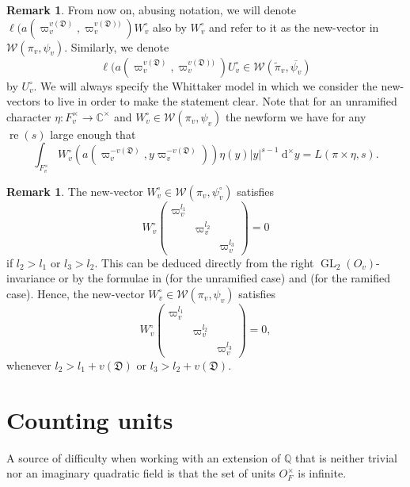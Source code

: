 \documentclass[a4paper,11pt]{amsart}
\theoremstyle{definition}
\newtheorem{remark}[theorem]{Remark}
\newcommand{\Q}{\mathbb{Q}}
\newcommand{\gelle}{\operatorname{GL}}
\newcommand{\real}{\operatorname{re}}
\newcommand{\CC}{\mathbb{C}}
\begin{document}
    \begin{remark}\label{rmk:newform}
        From now on, abusing notation, we will denote $\ell(a(\varpi_v^{v(\mathfrak{D})},\varpi_v^{v(\mathfrak{D}))})W_v^{\circ}$ also by $W_v^{\circ}$ and refer to it as the new-vector in $\mathcal{W}(\pi_v,\psi_v)$. Similarly, we denote $$\ell(a(\varpi_v^{v(\mathfrak{D})},\varpi_v^{v(\mathfrak{D}))}) U_v^\circ \in \mathcal{W}(\tilde{\pi}_v,\overline{\psi_v})$$ by $U_v^\circ$. We will always specify the Whittaker model in which we consider the new-vectors to live in order to make the statement clear.
        Note that for an unramified character $\eta \colon F_v^{\times}\to \CC^{\times}$ and $W_v^{\circ}\in \mathcal{W}(\pi_v,\psi_v)$ the newform we have for any $\real(s)$ large enough that
        \[\int_{F_v^{\times}}W_v^{\circ}(a(\varpi_v^{-v(\mathfrak{D})},y\varpi_v^{-v(\mathfrak{D})}))\eta(y)\vert{y}\vert^{s-1}\ \mathrm{d}^{\times}y = L(\pi\times\eta,s). \]
    \end{remark}
    
\begin{remark}
    The new-vector $W_v^{\circ}\in \mathcal{W}(\pi_v,\psi_v^{\circ})$ satisfies 
    \[ W_v^{\circ}\begin{pmatrix}
        \varpi_v^{l_1}&&\\&\varpi_v^{l_2}&\\&&\varpi_v^{l_3}
    \end{pmatrix}=0\]
    if $l_2>l_1$ or $l_3>l_2$. This can be deduced directly from the right $\gelle_2(O_v)$-invariance or by the formulae in \cite{Shalika} (for the unramified case) and \cite{matringe2012essential} (for the ramified case).
    Hence, the new-vector $W_v^{\circ} \in \mathcal{W}(\pi_v,\psi_v)$ satisfies 
    \[W_v^{\circ}\begin{pmatrix}
        \varpi_v^{l_1}&&\\&\varpi_v^{l_2}&\\&&\varpi_v^{l_3}
    \end{pmatrix}=0,\]
    whenever $l_2>l_1+v(\mathfrak{D})$ or $l_3>l_2+v(\mathfrak{D})$.
\end{remark}
    















\section{Counting units}\label{sec:Counting units}
A source of difficulty when working with an extension of $\Q$ that is neither trivial nor an imaginary quadratic field is that the set of units $O_F^{\times}$ is infinite. 
\end{document}
